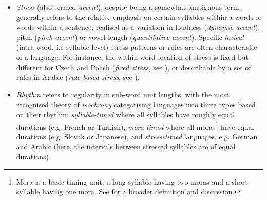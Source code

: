 \documentclass[bsc,frontabs,twoside,singlespacing,parskip,deptreport]{infthesis}
\begin{document}
{{{\begin{itemize}
        \item {\textit{Stress} (also termed \textit{accent}), despite being a somewhat ambiguous term, generally refers to the relative emphasis on certain syllables within a words or words within a sentence, realised as a variation in loudness (\textit{dynamic accent}), pitch (\textit{pitch accent}) or vowel length (\textit{quantitative accent}). Specific \textit{lexical} (intra-word, i.e syllable-level) stress patterns or rules are often characteristic of a language. For instance, the within-word location of stress is fixed but different for Czech and Polish (\textit{fixed stress}, see \citet{WALS_14}), or describable by a set of rules in Arabic (\textit{rule-based stress}, see \citet{WALS_15}).}
        \item {\textit{Rhythm} refers to regularity in sub-word unit lengths, with the most recognised theory of \textit{isochrony} categorising languages into three types based on their rhythm: \textit{syllable-timed} where all syllables have roughly equal durations (e.g. French or Turkish), \textit{mora-timed} where all moras\footnote{Mora is a basic timing unit; a long syllable having two moras and a short syllable having one mora. See \citet[p. 312]{Crystal_2008} for a broader definition and discussion.} have equal durations (e.g. Slovak or Japanese), and \textit{stress-timed} languages, e.g. German and Arabic (here, the intervals between stressed syllables are of equal durations).}
      \end{itemize}


}}}
\end{document}
